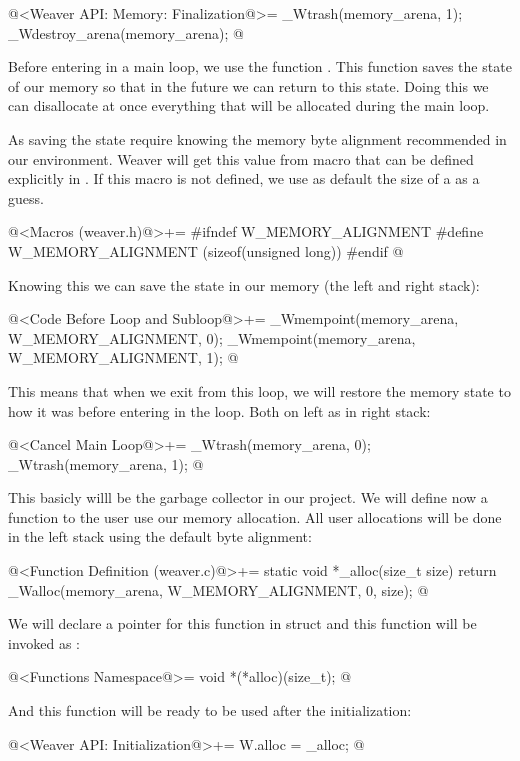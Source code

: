 \iniciocodigo
  @<Weaver API: Memory: Finalization@>=
_Wtrash(memory_arena, 1);
_Wdestroy_arena(memory_arena);
@
\fimcodigo

Before entering in a main loop, we use the
function . This function saves the state of
our memory so that in the future we can return to this state. Doing
this we can disallocate at once everything that will be allocated
during the main loop.

As saving the state require knowing the memory byte alignment
recommended in our environment. Weaver will get this value from
macro  that can be defined explicitly
in . If this macro is not defined, we use as
default the size of a  as a guess.

\iniciocodigo
@<Macros (weaver.h)@>+=
#ifndef W_MEMORY_ALIGNMENT
#define W_MEMORY_ALIGNMENT (sizeof(unsigned long))
#endif
@
\fimcodigo

Knowing this we can save the state in our memory (the left and right
stack):

\iniciocodigo
@<Code Before Loop and Subloop@>+=
_Wmempoint(memory_arena, W_MEMORY_ALIGNMENT, 0);
_Wmempoint(memory_arena, W_MEMORY_ALIGNMENT, 1);
@
\fimcodigo

This means that when we exit from this loop, we will restore the
memory state to how it was before entering in the loop. Both on left
as in right stack:

\iniciocodigo
@<Cancel Main Loop@>+=
_Wtrash(memory_arena, 0);
_Wtrash(memory_arena, 1);
@
\fimcodigo

This basicly willl be the garbage collector in our project. We will
define now a function to the user use our memory allocation. All user
allocations will be done in the left stack using the default byte
alignment:

\iniciocodigo
@<Function Definition (weaver.c)@>+=
static void *_alloc(size_t size){
  return _Walloc(memory_arena, W_MEMORY_ALIGNMENT, 0, size);
}
@
\fimcodigo

We will declare a pointer for this function in struct 
and this function will be invoked as :

\iniciocodigo
@<Functions Namespace@>=
void *(*alloc)(size_t);
@
\fimcodigo

And this function will be ready to be used after the initialization:

\iniciocodigo
@<Weaver API: Initialization@>+=
W.alloc = _alloc;
@
\fimcodigo

